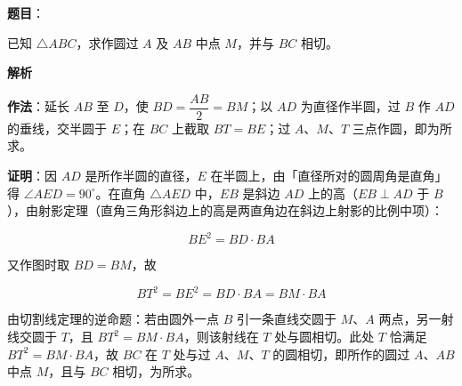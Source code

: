 \begin{answer}

\textbf{题目}：

已知 $\triangle ABC$，求作圆过 $A$ 及 $AB$ 中点 $M$，并与 $BC$ 相切。
\nopagebreak[4]
\begin{center}\end{center}
\nopagebreak[4]
\textbf{解析}
\nopagebreak[4]
\begin{center}\end{center}
\nopagebreak[4]
\textbf{作法}：延长 $AB$ 至 $D$，使 $BD=\dfrac{AB}2=BM$；以 $AD$ 为直径作半圆，过 $B$ 作 $AD$ 的垂线，交半圆于 $E$；在 $BC$ 上截取 $BT=BE$；过 $A$、$M$、$T$ 三点作圆，即为所求。

\textbf{证明}：因 $AD$ 是所作半圆的直径，$E$ 在半圆上，由「直径所对的圆周角是直角」得 $\angle AED=90^\circ$。在直角 $\triangle AED$ 中，$EB$ 是斜边 $AD$ 上的高（$EB\perp AD$ 于 $B$），由射影定理（直角三角形斜边上的高是两直角边在斜边上射影的比例中项）：

\nopagebreak[4]
\[
BE^2=BD\cdot BA
\]

又作图时取 $BD=BM$，故

\nopagebreak[4]
\[
BT^2=BE^2=BD\cdot BA=BM\cdot BA
\]

由切割线定理的逆命题：若由圆外一点 $B$ 引一条直线交圆于 $M$、$A$ 两点，另一射线交圆于 $T$，且 $BT^2=BM\cdot BA$，则该射线在 $T$ 处与圆相切。此处 $T$ 恰满足 $BT^2=BM\cdot BA$，故 $BC$ 在 $T$ 处与过 $A$、$M$、$T$ 的圆相切，即所作的圆过 $A$、$AB$ 中点 $M$，且与 $BC$ 相切，为所求。


\end{answer}

